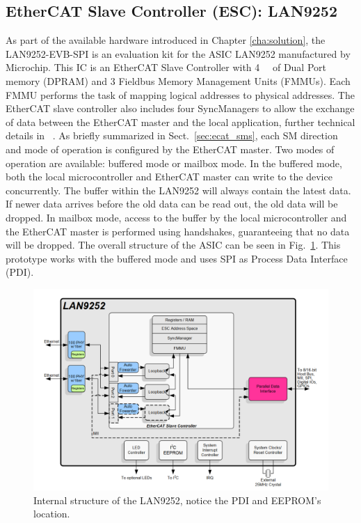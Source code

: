 \subsection{EtherCAT Slave Controller (ESC): LAN9252} 
As part of the available hardware introduced in Chapter \ref{cha:solution}, the LAN9252-EVB-SPI is an evaluation kit for the ASIC LAN9252 manufactured by Microchip. 
This IC is an EtherCAT Slave Controller with \SI{4}{\kilo\byte} of Dual Port memory (DPRAM) and 3 Fieldbus Memory Management Units (FMMUs). 
Each FMMU performs the task of mapping logical addresses to physical addresses.
The EtherCAT slave controller also includes four SyncManagers to allow the exchange of data between the EtherCAT master and the 
local application, further technical details in ~\cite{lan9252_data}.%
 As briefly summarized in Sect.~\ref{sec:ecat_sms}, each SM direction and mode of operation is configured by the EtherCAT master. Two modes of operation 
are available: buffered mode or mailbox mode. 
In the buffered mode, both the local microcontroller and EtherCAT master can write to the device concurrently. The buffer within the LAN9252 
will always contain the latest data. If newer data arrives before the old data can be read out, the old data will be dropped. In mailbox
mode, access to the buffer by the local microcontroller and the EtherCAT master is performed using handshakes, guaranteeing that no data 
will be dropped. The overall structure of the ASIC can be seen in Fig.~\ref{fig:lan92struct}. This prototype works with the buffered mode and uses SPI as Process Data Interface (PDI).


\begin{figure}[ht]
  \centering
  \includegraphics[width=\textwidth]{imgs/impl-lan-structure.PNG}
  \caption{Internal structure of the LAN9252, notice the PDI and EEPROM's location.}
  \label{fig:lan92struct}
\end{figure}


